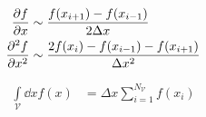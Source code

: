 \documentclass[a4paper,10pt]{article}
\newcommand{\suml}{\sum\limits}
\newcommand{\intl}{\int\limits}
\begin{document}
\begin{align}
	\pdv{f}{x}
	&\sim
	\frac{f(x_{i+1})-f(x_{i-1})}{2\Delta x}
\\
	\pdv[2]{f}{x}
	&\sim
	\frac{2f(x_{i})-f(x_{i-1})-f(x_{i+1})}{\Delta x^2}
\end{align}

\begin{align}
	\intl_{\mathcal{V}}
	\dd{x}
	f(x)
	&=
	\Delta x
	\suml_{i=1}^{N_\mathcal{V}}
	f(x_i)
\end{align}


\begin{comment}


\begin{align}
	f(\vb{x})
	&=
	-ax_1^3
	+\beta x_1
	-
	K
	x_2
\\
	&=
	f_1(x_1)
	+
	f_2(x_2)
\end{align}

\begin{align}
	\pdv{t}
	\rho_1
	(x_1,t)
	&=
	-
	f_1^\prime(x_1)
	\rho_1
	(x_1,t)
	-
	f_1(x_1)
	\pdv{x_1}	
	\rho_1
	(x_1,t)
	-
	\intl
	\dd{x_2}
	f_2(x_2)
	\pdv{x_1}
	\rho_2
	(\vb{x},t)
	+
	D_0
	\pdv[2]{x_1}
	\rho_1
	(x_1,t)
\\
	\pdv{t}
	\rho_2
	(\vb{x},t)
	&=
	-
	f_1^\prime(x_1)
	\rho_2
	(\vb{x},t)
	-
	f(x_1)
	\pdv{x_1}
	\rho_2
	(\vb{x},t)
	-
	f(x_2)
	\pdv{x_1}
	\rho_2
	(\vb{x},t)
	+
	D_0
	\pdv[2]{x_1}
	\rho_2
	(\vb{x},t)
	+
	\pdv{x_2}
	\pqty{
		\intl
		\dd{v_2}
		\rho_1(v_2,t-\tau)
		v_2
	}
	\rho_2(\vb{x},t)
\end{align}

\begin{align}
	\pdv{t}
	\vb*{\rho}
	(\vb{x},t)
	&=
	-
	f_1^\prime
	(x_1)
	\vb*{\rho}
	(\vb{x},t)
	-
	f_1
	(x_1)
	\pdv{x_1}	
	\vb*{\rho}
	(\vb{x},t)
	-
	\vb{e}_2
	\cdot
	f_2(x_2)
	\pdv{x_1}
	\vb*{\rho}
	(\vb{x},t)
	+
	D_0
	\pdv[2]{x_1}
	\vb*{\rho}
	(\vb{x},t)
	+
	\pmqty{
		-
		\pdv{x_1}
		\intl\dd{x_2}
		f_2(x_2)
		\rho_2
		(\vb{x},t)
		\\
		\pdv{x_2}
		\intl\dd{v_2}
		v_2
		\rho_1(v_2,t-\tau)
		\rho_2
		(\vb{x},t)
	}
\end{align}

\end{comment}
\end{document}
